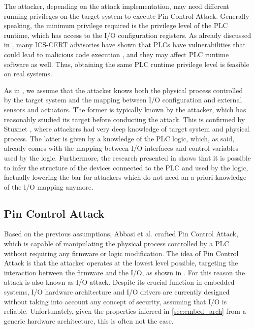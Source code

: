 The attacker, depending on the attack implementation, may need different running privileges on the target system to execute Pin Control Attack.
Generally speaking, the minimum privilege required is the privilege level of the PLC runtime, which has access to the I/O configuration registers.
As already discussed in \cite{ghostplc}, many ICS-CERT advisories have shown that PLCs have vulnerabilities that could lead to malicious code execution
\cite{plc-network,abb-codesys,codesys-server,schneider-bof,rockwell-vuln,rockwell-vuln2}, and they may affect PLC runtime software as well.
Thus, obtaining the same PLC runtime privilege level is feasible on real systems.

As in \cite{ghostplc}, we assume that the attacker knows both the physical process controlled by the target system and the mapping
between I/O configuration and external sensors and actuators. The former is typically known by the attacker, which has reasonably studied its target before conducting the attack.
This is confirmed by Stuxnet \cite{stuxnet}, where attackers had very deep knowledge of target system and physical process.
The latter is given by a knowledge of the PLC logic, which, as said, already comes with the mapping between I/O interfaces and control variables used by the logic.
Furthermore, the research presented in \cite{dynamic-payload,sabot} shows that it is possible to infer the structure of the devices connected to the PLC and used by the logic,
factually lowering the bar for attackers which do not need an a priori knowledge of the I/O mapping anymore.


\subsection{Pin Control Attack}

Based on the previous assumptions, Abbasi et al. \cite{ghostplc} crafted Pin Control Attack, which is capable of manipulating the physical process
controlled by a PLC without requiring any firmware or logic modification.
The idea of Pin Control Attack is that the attacker operates at the lowest level possible, targeting the interaction
between the firmware and the I/O, as shown in \myfig{\ref{fig:target}}. For this reason the attack is also known as I/O attack.
Despite its crucial function in embedded systems, I/O hardware architecture and I/O drivers are currently designed
without taking into account any concept of security, assuming that I/O is reliable. Unfortunately, given the properties inferred in \sec \ref{sec:embed_arch}
from a generic hardware architecture, this is often not the case.

